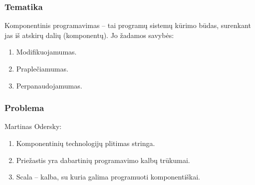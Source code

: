 \begin{comment}
  \begin{enumerate}
    \item Tematika (svarbiausių tematikos sąvokų apibrėžimai,
      įvadas į tematiką) - 1 skaidrė
    \item Problemos/uždavinio formulavimas (iš to turi išplaukti
      pagrindinė darbo tema) - 1 skaidrė
    \item Darbo tikslo formulavimas (jei sutampa su problemos
      formulavimu, tai kartoti nereikia) - 1 skaidrė
    \item Darbo planas (kaip pasieksite tikslą) - čia surašote
      punktus, kuriais buvo/bus pasiektas darbo tikslas - 1 skaidrė
    \item Temos gynimui (magistrantams): svarbiausios sąvokos
      (apibrėžimai, jei ilgi, neturi būti rašomi - turi būti sakomi
      žodžiu) - 2-3 skaidrės
    \item Darbo gynimui (bakalaurams, magistrantams): darbo metu
      iškilusios problemos, esminiai priimti sprendimai, kas buvo
      padaryta jūsų pačių ("susipažinau", "sukonspektavau",
      "išsiaiškinau", "išmokau" tinka tik kursiniams darbams!) - 3-6
      skaidrės
    \item (Laukiami) rezultatai - sąrašo pavidalu, ne daugiau trijų.
      "Susipažinau", "sukonspektavau", "išsiaiškinau", "išmokau" tinka
      tik kursiniams darbams! - 1 skaidrė
    \item Išvados - sąrašo pavidalu, ne daugiau trijų (temos gynime
      nereikia) - 1 skaidrė. Nebandykite rezultatų, pastebėjimų,
      komentarų, nuomonių apiforminti kaip išvadų!
  \end{enumerate}
\end{comment}

\begin{frame}
  \frametitle{Tematika}
  Komponentinis programavimas – tai programų sistemų kūrimo būdas,
  surenkant jas iš atskirų dalių (komponentų). Jo žadamos savybės:
  \begin{enumerate}
    \item Modifikuojamumas.
    \item Praplečiamumas.
    \item Perpanaudojamumas.
  \end{enumerate}
\end{frame}

\begin{frame}
  \frametitle{Problema}
  Martinas Odersky:
  \begin{enumerate}
    \item Komponentinių technologijų plitimas stringa.
    \item Priežastis yra dabartinių programavimo kalbų trūkumai.
    \item Scala – kalba, su kuria galima programuoti komponentiškai.
  \end{enumerate}
\end{frame}


